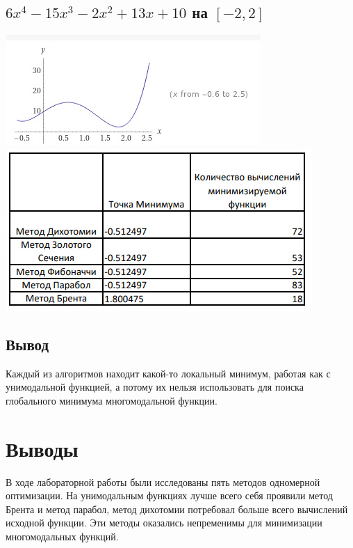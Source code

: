 \documentclass[a4paper,12pt]{article}
\begin{document}
\subsection{$6x^4 - 15x^3 - 2x^2 + 13x+ 10$ на $[-2, 2]$}
\includegraphics[width=\linewidth]{poly1.PNG}
\includegraphics[width=\linewidth]{poly2.PNG}

\subsection{Вывод}
Каждый из алгоритмов находит какой-то локальный минимум, работая как с унимодальной функцией, а потому их нельзя использовать для поиска глобального минимума многомодальной функции.

\section{Выводы}
В ходе лабораторной работы были исследованы пять методов одномерной оптимизации. На унимодальным функциях лучше всего себя проявили метод Брента и метод парабол, метод дихотомии потребовал больше всего вычислений исходной функции. Эти методы оказались непременимы для минимизации многомодальных функций.
\end{document}

